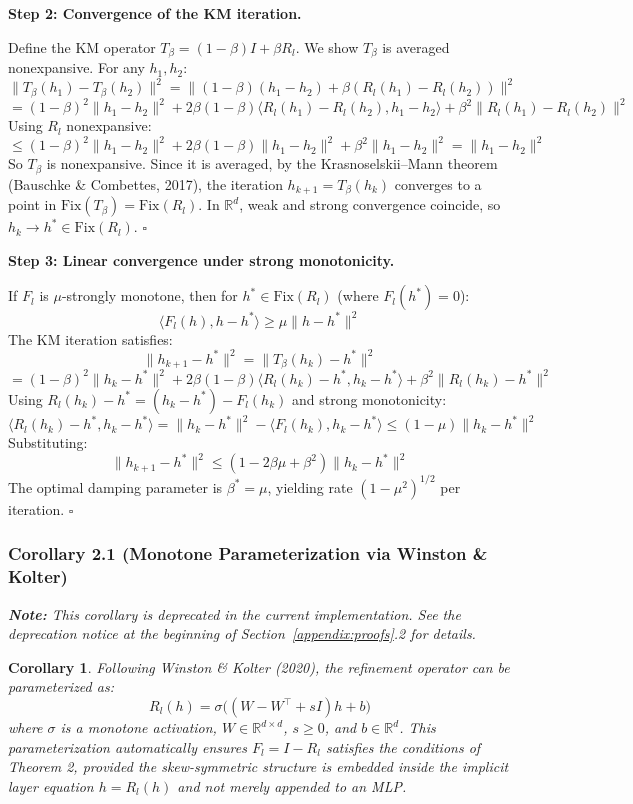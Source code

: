 \documentclass[11pt,a4paper]{article}
\newtheorem{corollary}{Corollary}[theorem]
\theoremstyle{definition}
\begin{document}
\vspace{0.5em}
\noindent\textbf{Step 2: Convergence of the KM iteration.}

\noindent Define the KM operator $T_\beta = (1 - \beta) I + \beta R_l$. We show $T_\beta$ is averaged nonexpansive. For any $h_1, h_2$:
\[ \|T_\beta(h_1) - T_\beta(h_2)\|^2 = \|(1-\beta)(h_1 - h_2) + \beta(R_l(h_1) - R_l(h_2))\|^2 \]
\[ = (1-\beta)^2\|h_1 - h_2\|^2 + 2\beta(1-\beta)\langle R_l(h_1) - R_l(h_2), h_1 - h_2\rangle + \beta^2\|R_l(h_1) - R_l(h_2)\|^2 \]
Using $R_l$ nonexpansive:
\[ \leq (1-\beta)^2\|h_1 - h_2\|^2 + 2\beta(1-\beta)\|h_1 - h_2\|^2 + \beta^2\|h_1 - h_2\|^2 = \|h_1 - h_2\|^2 \]
So $T_\beta$ is nonexpansive. Since it is averaged, by the Krasnoselskii--Mann theorem (Bauschke \& Combettes, 2017), the iteration $h_{k+1} = T_\beta(h_k)$ converges to a point in $\mathrm{Fix}(T_\beta) = \mathrm{Fix}(R_l)$. In $\mathbb{R}^d$, weak and strong convergence coincide, so $h_k \to h^* \in \mathrm{Fix}(R_l)$. \hfill$\square$

\vspace{0.5em}
\noindent\textbf{Step 3: Linear convergence under strong monotonicity.}

\noindent If $F_l$ is $\mu$-strongly monotone, then for $h^* \in \mathrm{Fix}(R_l)$ (where $F_l(h^*) = 0$):
\[ \langle F_l(h), h - h^* \rangle \geq \mu\|h - h^*\|^2 \]
The KM iteration satisfies:
\[ \|h_{k+1} - h^*\|^2 = \|T_\beta(h_k) - h^*\|^2 \]
\[ = (1-\beta)^2\|h_k - h^*\|^2 + 2\beta(1-\beta)\langle R_l(h_k) - h^*, h_k - h^*\rangle + \beta^2\|R_l(h_k) - h^*\|^2 \]
Using $R_l(h_k) - h^* = (h_k - h^*) - F_l(h_k)$ and strong monotonicity:
\[ \langle R_l(h_k) - h^*, h_k - h^* \rangle = \|h_k - h^*\|^2 - \langle F_l(h_k), h_k - h^* \rangle \leq (1 - \mu)\|h_k - h^*\|^2 \]
Substituting:
\[ \|h_{k+1} - h^*\|^2 \leq (1 - 2\beta\mu + \beta^2)\|h_k - h^*\|^2 \]
The optimal damping parameter is $\beta^* = \mu$, yielding rate $(1 - \mu^2)^{1/2}$ per iteration. \hfill$\square$

\subsubsection{Corollary 2.1 (Monotone Parameterization via Winston \& Kolter)}

\noindent\textit{\textbf{Note:} This corollary is deprecated in the current implementation. See the deprecation notice at the beginning of Section~\ref{appendix:proofs}.2 for details.}

\begin{corollary}
Following Winston \& Kolter (2020), the refinement operator can be parameterized as:
\[ R_l(h) = \sigma\bigl((W - W^\top + sI) h + b\bigr) \]
where $\sigma$ is a monotone activation, $W \in \mathbb{R}^{d \times d}$, $s \geq 0$, and $b \in \mathbb{R}^d$. This parameterization automatically ensures $F_l = I - R_l$ satisfies the conditions of Theorem 2, \textit{provided} the skew-symmetric structure is embedded inside the implicit layer equation $h = R_l(h)$ and not merely appended to an MLP.
\end{corollary}
\end{document}
